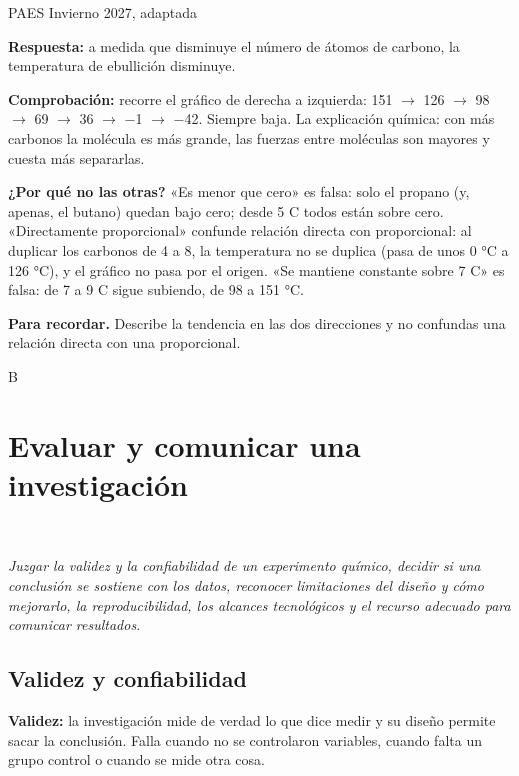 \begin{elejemplo}{PAES Invierno 2027, adaptada}
{\textbf{Respuesta:} a medida que disminuye el número de átomos de carbono, la temperatura de ebullición disminuye.

\textbf{Comprobación:} recorre el gráfico de derecha a izquierda: 151 \ensuremath{\rightarrow} 126 \ensuremath{\rightarrow} 98 \ensuremath{\rightarrow} 69 \ensuremath{\rightarrow} 36 \ensuremath{\rightarrow} \ensuremath{-}1 \ensuremath{\rightarrow} \ensuremath{-}42. Siempre baja.  La explicación química: con más carbonos la molécula es más grande, las fuerzas entre moléculas son mayores y cuesta más separarlas.

\textbf{¿Por qué no las otras?} «Es menor que cero» es falsa: solo el propano (y, apenas, el butano) quedan bajo cero; desde 5 C todos están sobre cero. «Directamente proporcional» confunde relación directa con proporcional: al duplicar los carbonos de 4 a 8, la temperatura no se duplica (pasa de unos 0 °C a 126 °C), y el gráfico no pasa por el origen. «Se mantiene constante sobre 7 C» es falsa: de 7 a 9 C sigue subiendo, de 98 a 151 °C.

\textbf{\color{cienciaD}Para recordar.} Describe la tendencia en las dos direcciones y no confundas una relación directa con una proporcional.}{B}
\end{elejemplo}

\section[Evaluar y comunicar una investigación]{Evaluar y comunicar una investigación}
\modcomun\ \ {\color{gris}\itshape Juzgar la validez y la confiabilidad de un experimento químico, decidir si una conclusión se sostiene con los datos, reconocer limitaciones del diseño y cómo mejorarlo, la reproducibilidad, los alcances tecnológicos y el recurso adecuado para comunicar resultados.\par}
\subsection{Validez y confiabilidad}
\textbf{Validez:} la investigación mide de verdad lo que dice medir y su diseño permite sacar la conclusión. Falla cuando no se controlaron variables, cuando falta un grupo control o cuando se mide otra cosa.

